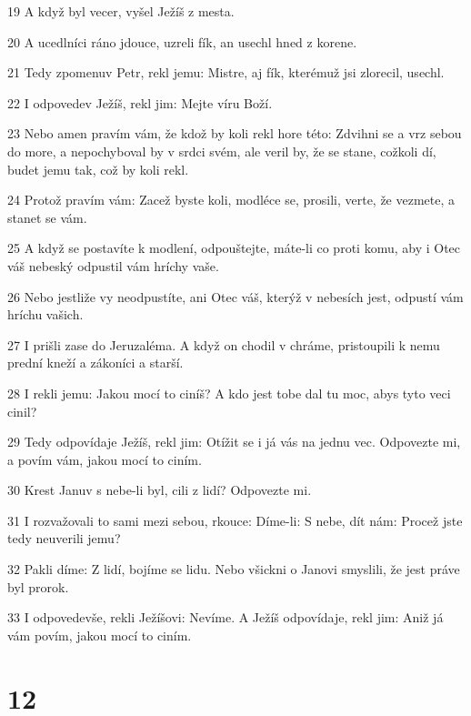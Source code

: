 \par 19 A když byl vecer, vyšel Ježíš z mesta.
\par 20 A ucedlníci ráno jdouce, uzreli fík, an usechl hned z korene.
\par 21 Tedy zpomenuv Petr, rekl jemu: Mistre, aj fík, kterémuž jsi zlorecil, usechl.
\par 22 I odpovedev Ježíš, rekl jim: Mejte víru Boží.
\par 23 Nebo amen pravím vám, že kdož by koli rekl hore této: Zdvihni se a vrz sebou do more, a nepochyboval by v srdci svém, ale veril by, že se stane, cožkoli dí, budet jemu tak, což by koli rekl.
\par 24 Protož pravím vám: Zacež byste koli, modléce se, prosili, verte, že vezmete, a stanet se vám.
\par 25 A když se postavíte k modlení, odpouštejte, máte-li co proti komu, aby i Otec váš nebeský odpustil vám hríchy vaše.
\par 26 Nebo jestliže vy neodpustíte, ani Otec váš, kterýž v nebesích jest, odpustí vám hríchu vašich.
\par 27 I prišli zase do Jeruzaléma. A když on chodil v chráme, pristoupili k nemu prední kneží a zákoníci a starší.
\par 28 I rekli jemu: Jakou mocí to ciníš? A kdo jest tobe dal tu moc, abys tyto veci cinil?
\par 29 Tedy odpovídaje Ježíš, rekl jim: Otížit se i já vás na jednu vec. Odpovezte mi, a povím vám, jakou mocí to ciním.
\par 30 Krest Januv s nebe-li byl, cili z lidí? Odpovezte mi.
\par 31 I rozvažovali to sami mezi sebou, rkouce: Díme-li: S nebe, dít nám: Procež jste tedy neuverili jemu?
\par 32 Pakli díme: Z lidí, bojíme se lidu. Nebo všickni o Janovi smyslili, že jest práve byl prorok.
\par 33 I odpovedevše, rekli Ježíšovi: Nevíme. A Ježíš odpovídaje, rekl jim: Aniž já vám povím, jakou mocí to ciním.

\chapter{12}

